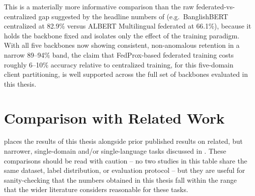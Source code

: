 This is a materially more informative comparison than the raw federated-vs-centralized gap suggested by the headline numbers of  (e.g.\ BanglishBERT centralized at 82.9\% versus ALBERT Multilingual federated at 66.1\%), because it holds the backbone fixed and isolates only the effect of the training paradigm. With all five backbones now showing consistent, non-anomalous retention in a narrow 89--94\% band, the claim that FedProx-based federated training costs roughly 6--10\% accuracy relative to centralized training, for this five-domain client partitioning, is well supported across the full set of backbones evaluated in this thesis.

\section{Comparison with Related Work}
\label{sec:related-work-comparison}

 places the results of this thesis alongside prior published results on related, but narrower, single-domain and/or single-language tasks discussed in . These comparisons should be read with caution -- no two studies in this table share the same dataset, label distribution, or evaluation protocol -- but they are useful for sanity-checking that the numbers obtained in this thesis fall within the range that the wider literature considers reasonable for these tasks.

